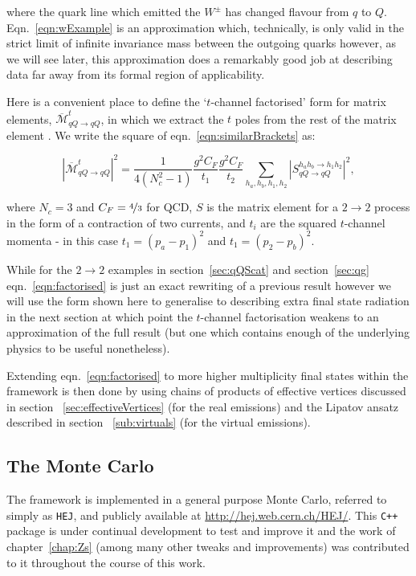		where the quark line which emitted the $W^\pm$ has changed flavour from $q$ to $Q$.  Eqn.~\eqref{eqn:wExample}
		is an approximation which, technically, is only valid in the strict limit of infinite invariance mass
		between the outgoing quarks however, as we will see later, this approximation does a remarkably good
		job at describing data far away from its formal region of applicability.

		Here is a convenient place to define the `$t$-channel factorised' form for matrix elements,
		$\overline{\mathcal{M}}^t_{qQ\rightarrow qQ}$, in which we extract the $t$ poles from the
		rest of the matrix element \cite{Andersen:2009nu}.  We write the square of
		eqn.~\eqref{eqn:similarBrackets} as:

		\begin{equation}
			|\overline{\mathcal{M}}^t_{qQ\rightarrow qQ}|^2 = \frac{1}{4(N_c^2-1)}
			\frac{g^2C_F}{t_1}\frac{g^2C_F}{t_2} \sum_{h_a, h_b, h_1, h_2}
			|S_{qQ\rightarrow qQ}^{h_ah_b\rightarrow h_1h_2}|^2,
			\label{eqn:factorised}
		\end{equation}

		where $N_c=3$ and $C_F=\nicefrac{4}{3}$ for QCD, $S$ is the matrix element for a $2\rightarrow2$ process
		in the form of a contraction of two currents, and $t_i$ are the squared $t$-channel momenta - in this
		case $t_1=(p_a-p_1)^2$ and $t_1=(p_2-p_b)^2$.

		While for the $2\to2$ examples in section~\eqref{sec:qQScat} and section~\eqref{sec:qg} eqn.~\eqref{eqn:factorised}
		is just an exact rewriting of a previous result however we will use the form shown here to generalise to describing
		extra final state radiation in the next section at which point the $t$-channel factorisation weakens to
		an approximation of the full result (but one which contains enough of the underlying physics to be useful
		nonetheless).

		Extending eqn.~\eqref{eqn:factorised} to more higher multiplicity final states within the \hej
		framework is then done by using chains of products of effective vertices discussed in section
		~\eqref{sec:effectiveVertices} (for the real emissions) and the Lipatov ansatz described in section
		~\eqref{sub:virtuals} (for the virtual emissions).

	\subsection{The \hej Monte Carlo}

		The \hej framework is implemented in a general purpose Monte Carlo, referred to simply as
		\texttt{HEJ}, and publicly available at \url{http://hej.web.cern.ch/HEJ/}.  This
		\texttt{C++} package is under continual development to test and improve it and the work
		of chapter~\ref{chap:Zs} (among many other tweaks and improvements) was contributed to
		it throughout the course of this work.

